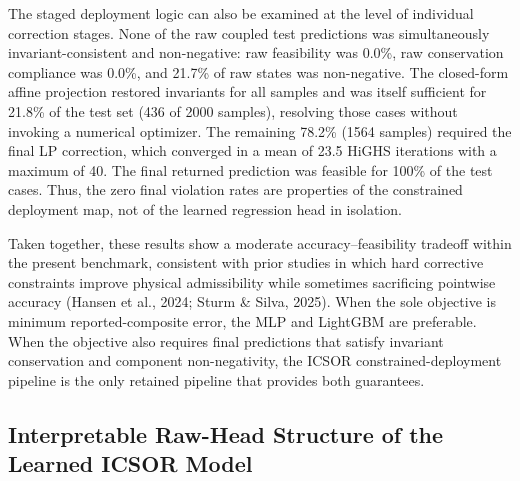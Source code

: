 \documentclass[a4paper,fleqn]{cas-sc}
\DeclareRobustCommand{\currentrev}[1]{{\color{currentRevisionBlue}#1}}
\newenvironment{currentrevblock}{\begingroup\color{currentRevisionBlue}}{\endgroup}
\DeclareRobustCommand{\currentrev}[1]{#1}
\newenvironment{currentrevblock}{}{}
\newenvironment{revblock}{}{}
\newenvironment{revblockr21}{}{}
\newenvironment{revblockr22}{}{}
\begin{document}
\begin{revblock}
\begin{revblockr22}
\begin{currentrevblock}
The staged deployment logic can also be examined at the level of individual correction stages. None of the raw coupled test predictions was simultaneously invariant-consistent and non-negative: raw feasibility was 0.0\%, raw conservation compliance was 0.0\%, and 21.7\% of raw states was non-negative. The closed-form affine projection restored invariants for all samples and was itself sufficient for 21.8\% of the test set (436 of 2000 samples), resolving those cases without invoking a numerical optimizer. The remaining 78.2\% (1564 samples) required the final LP correction, which converged in a mean of 23.5 HiGHS iterations with a maximum of 40. The final returned prediction was feasible for 100\% of the test cases. Thus, the zero final violation rates are properties of the constrained deployment map, not of the learned regression head in isolation.
\end{currentrevblock}

\begin{currentrevblock}
Taken together, these results show a moderate accuracy--feasibility tradeoff within the present benchmark, consistent with prior studies in which hard corrective constraints improve physical admissibility while sometimes sacrificing pointwise accuracy (Hansen et al., 2024; Sturm \& Silva, 2025). When the sole objective is minimum reported-composite error, the MLP and LightGBM are preferable. When the objective also requires final predictions that satisfy invariant conservation and component non-negativity, the ICSOR constrained-deployment pipeline is the only retained pipeline that provides both guarantees.
\end{currentrevblock}
\end{revblockr22}

\begin{revblockr21}
\subsection{\currentrev{Interpretable Raw-Head Structure of the Learned ICSOR Model}}


\end{revblockr21}
\end{revblock}
\end{document}
